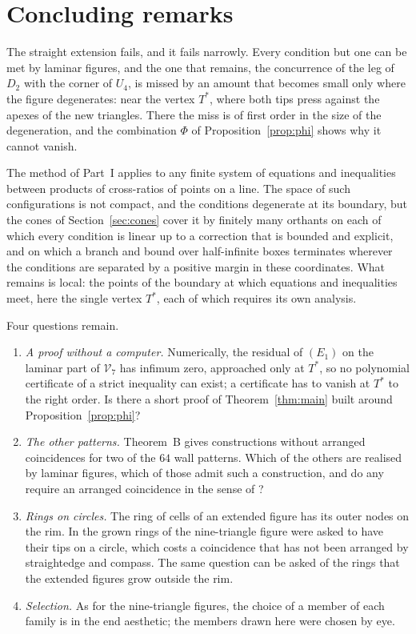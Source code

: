 \documentclass[11pt,a4paper]{article}
\theoremstyle{definition}
\theoremstyle{remark}
\newcommand{\V}{\mathcal{V}}
\newcommand{\Tstar}{T^{*}}
\begin{document}
\section{Concluding remarks}
The straight extension fails, and it fails narrowly. Every condition but one can be met by laminar
figures, and the one that remains, the concurrence of the leg of $D_2$ with the corner of $U_4$, is missed
by an amount that becomes small only where the figure degenerates: near the vertex $\Tstar$, where both
tips press against the apexes of the new triangles. There the miss is of first order in the size of the
degeneration, and the combination $\Phi$ of Proposition~\ref{prop:phi} shows why it cannot vanish.

The method of Part~I applies to any finite system of equations and inequalities between products of
cross-ratios of points on a line. The space of such configurations is not compact, and the conditions
degenerate at its boundary, but the cones of Section~\ref{sec:cones} cover it by finitely many orthants on
each of which every condition is linear up to a correction that is bounded and explicit, and on which a
branch and bound over half-infinite boxes terminates wherever the conditions are separated by a positive
margin in these coordinates. What remains is local: the points of the boundary at which equations and
inequalities meet, here the single vertex $\Tstar$, each of which requires its own analysis.

Four questions remain.
\begin{enumerate}[leftmargin=2em]
\item \emph{A proof without a computer.} Numerically, the residual of $(E_1)$ on the laminar part of
$\V_7$ has infimum zero, approached only at $\Tstar$, so no polynomial certificate of a strict inequality
can exist; a certificate has to vanish at $\Tstar$ to the right order. Is there a short proof of
Theorem~\ref{thm:main} built around Proposition~\ref{prop:phi}?
\item \emph{The other patterns.} Theorem~B gives constructions without arranged coincidences for two of
the $64$ wall patterns. Which of the others are realised by laminar figures, which of those admit such a
construction, and do any require an arranged coincidence in the sense of \cite[\S7.1]{CK}?
\item \emph{Rings on circles.} The ring of cells of an extended figure has its outer nodes on the rim. In
\cite{CK} the grown rings of the nine-triangle figure were asked to have their tips on a circle, which
costs a coincidence that has not been arranged by straightedge and compass. The same question can be
asked of the rings that the extended figures grow outside the rim.
\item \emph{Selection.} As for the nine-triangle figures, the choice of a member of each family is in
the end aesthetic; the members drawn here were chosen by eye.
\end{enumerate}
\end{document}
